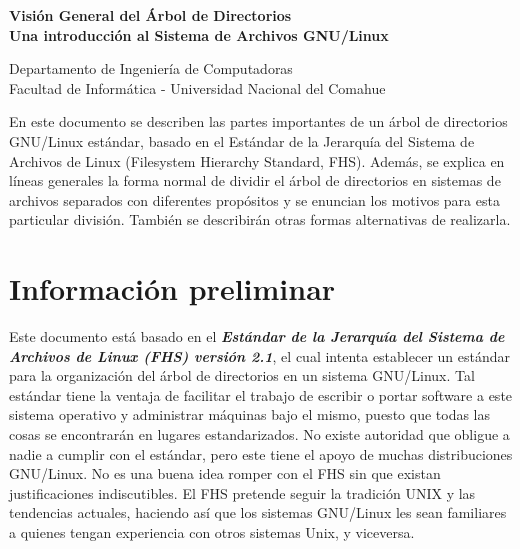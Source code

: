 ﻿
\usepackage{fancyhdr}
	\pagestyle{fancy}
\usepackage{lastpage}	
	\lhead{}
	\chead{}
	\rhead{}
	\cfoot{}
	\rfoot{\footnotesize \thepage\ }	%
	\renewcommand{\headrulewidth}{0.0pt}
	\renewcommand{\footrulewidth}{0.4pt}

\def\ti#1#2{\texttt{#1} & #2 \\ }





\setlength{\parindent}{0pt}


\makeatletter
{\color{bl} \centering \huge \sc \textbf{
Visión General del Árbol de Directorios \\
\large \vspace*{-8pt} \color{black} Una introducción al Sistema de Archivos GNU/Linux
\vspace*{8pt} }\par}
\makeatother


\makeatletter
{\centering \small 
	Departamento de Ingeniería de Computadoras \\
	Facultad de Informática - Universidad Nacional del Comahue \\
	\vspace{20pt} }
\makeatother



En este documento se describen las partes importantes de un árbol de
directorios GNU/Linux estándar, basado en el Estándar de la Jerarquía del
Sistema de Archivos de Linux (Filesystem Hierarchy Standard, FHS). Además, se
explica en líneas generales la forma normal de dividir el árbol de directorios
en  sistemas de archivos separados con diferentes propósitos y se enuncian los
motivos para esta particular división. También se describirán otras formas
alternativas de realizarla.  

\section{ Información preliminar}

Este documento está basado en el \textbf{\textit{Estándar de la Jerarquía del
Sistema de Archivos de Linux (FHS) versión 2.1}}, el cual intenta
establecer un estándar para la organización del árbol de directorios en un
sistema GNU/Linux. Tal estándar tiene la ventaja de facilitar el trabajo de
escribir o portar software a este sistema operativo y administrar máquinas bajo
el mismo, puesto que todas las cosas se encontrarán en lugares estandarizados.
No existe autoridad que obligue a nadie a cumplir con el estándar, pero este
tiene el apoyo de muchas distribuciones GNU/Linux. No es una buena idea romper
con el FHS sin que existan justificaciones indiscutibles. El FHS pretende seguir
la tradición UNIX y las tendencias actuales, haciendo así que los sistemas
GNU/Linux les sean familiares a quienes tengan experiencia con otros sistemas
Unix, y viceversa.  

